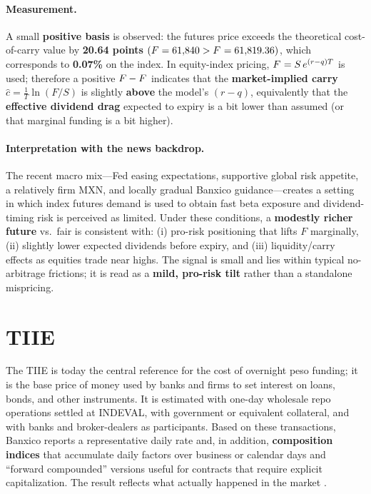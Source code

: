 \documentclass[10pt,a4paper]{article} %
\let\oldsection\section
\renewcommand{\section}{%
      \clearpage
      \thispagestyle{myfancy}%
      \oldsection
    }
\begin{document}
\paragraph{Measurement.} A small \textbf{positive basis} is observed: the futures price exceeds the theoretical cost-of-carry value by \textbf{20.64 points} $(F=61{,}840 > F^{\*}=61{,}819.36)$, which corresponds to \textbf{0.07\%} on the index. In equity-index pricing, $F^{\*}=S\,e^{(r-q)T}$ is used; therefore a positive $F-F^{\*}$ indicates that the \textbf{market-implied carry} $\hat{c} = \tfrac{1}{T}\ln(F/S)$ is slightly \textbf{above} the model’s $(r-q)$, equivalently that the \textbf{effective dividend drag} expected to expiry is a bit lower than assumed (or that marginal funding is a bit higher).

\paragraph{Interpretation with the news backdrop.} The recent macro mix—Fed easing expectations, supportive global risk appetite, a relatively firm MXN, and locally gradual Banxico guidance—creates a setting in which index futures demand is used to obtain fast beta exposure and dividend-timing risk is perceived as limited. Under these conditions, a \textbf{modestly richer future} vs.\ fair is consistent with: (i) pro-risk positioning that lifts $F$ marginally, (ii) slightly lower expected dividends before expiry, and (iii) liquidity/carry effects as equities trade near highs. The signal is small and lies within typical no-arbitrage frictions; it is read as a \textbf{mild, pro-risk tilt} rather than a standalone mispricing.




\newpage
\section{TIIE}


The TIIE is today the central reference for the cost of overnight peso funding; it is the base price of money used by banks and firms to set interest on loans, bonds, and other instruments. It is estimated with one-day wholesale repo operations settled at INDEVAL, with government or equivalent collateral, and with banks and broker-dealers as participants. Based on these transactions, Banxico reports a representative daily rate and, in addition, \textbf{composition indices} that accumulate daily factors over business or calendar days and ``forward compounded'' versions useful for contracts that require explicit capitalization. The result reflects what actually happened in the market \citep{banxico_methodology,banxico_indices}.
\end{document}
